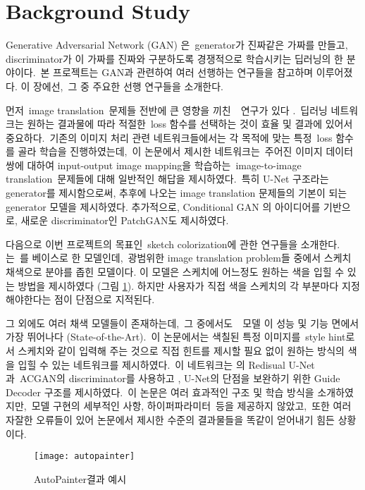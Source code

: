 \section{Background Study}


Generative Adversarial Network (GAN) \cite{Goodfellow2014}은 generator가 진짜같은 가짜를 만들고, discriminator가 이 가짜를 진짜와 구분하도록 경쟁적으로 학습시키는 딥러닝의 한 분야이다. 본 프로젝트는 GAN과 관련하여 여러 선행하는 연구들을 참고하며 이루어졌다.
이 장에선, 그 중 주요한 선행 연구들을 소개한다.

먼저 image translation 문제들 전반에 큰 영향을 끼친 \pixpix~연구가 있다 \cite{phillip2017}. 딥러닝 네트워크는 원하는 결과물에 따라 적절한 loss 함수를 선택하는 것이 효율 및 결과에 있어서 중요하다. 기존의 이미지 처리 관련 네트워크들에서는 각 목적에 맞는 특정 loss 함수를 골라 학습을 진행하였는데, 이 논문에서 제시한 네트워크는 주어진 이미지 데이터 쌍에 대하여 input-output image mapping을 학습하는 image-to-image translation 문제들에 대해 일반적인 해답을 제시하였다. 특히 U-Net 구조라는 generator를 제시함으로써, 추후에 나오는 image translation 문제들의 기본이 되는 generator 모델을 제시하였다.
추가적으로, Conditional GAN \cite{Mirza2014CGAN}의 아이디어를 기반으로, 새로운 discriminator인 PatchGAN도 제시하였다.

다음으로 이번 프로젝트의 목표인 sketch colorization에 관한 연구들을 소개한다.
\autopaint 는 \pixpix 를 베이스로 한 모델인데, 광범위한 image translation problem들 중에서 스케치 채색으로 분야를 좁힌 모델이다.
이 모델은 스케치에 어느정도 원하는 색을 입힐 수 있는 방법을 제시하였다 (그림 \ref{fig:autopainter}).
하지만 사용자가 직접 색을 스케치의 각 부분마다 지정해야한다는 점이 단점으로 지적된다.
 
그 외에도 여러 채색 모델들이 존재하는데, 그 중에서도 \stylepaint~모델 \cite{Zhang2017}이 성능 및 기능 면에서 가장 뛰어나다 (State-of-the-Art). 이 논문에서는 색칠된 특정 이미지를 style hint로서 스케치와 같이 입력해 주는 것으로 직접 힌트를 제시할 필요 없이 원하는 방식의 색을 입힐 수 있는 네트워크를 제시하였다. 이 네트워크는 \pixpix 의 Redisual U-Net과 ACGAN의 discriminator를 사용하고 \cite{Odena2017}, U-Net의 단점을 보완하기 위한 Guide Decoder 구조를 제시하였다. 이 논문은 여러 효과적인 구조 및 학습 방식을 소개하였지만, 모델 구현의 세부적인 사항, 하이퍼파라미터 등을 제공하지 않았고, 또한 여러 자잘한 오류들이 있어 논문에서 제시한 수준의 결과물들을 똑같이 얻어내기 힘든 상황이다.

\begin{figure}[t]
	\centering
	\texttt{[image: autopainter]}
	\caption{AutoPainter결과 예시}
	\label{fig:autopainter}
\end{figure}